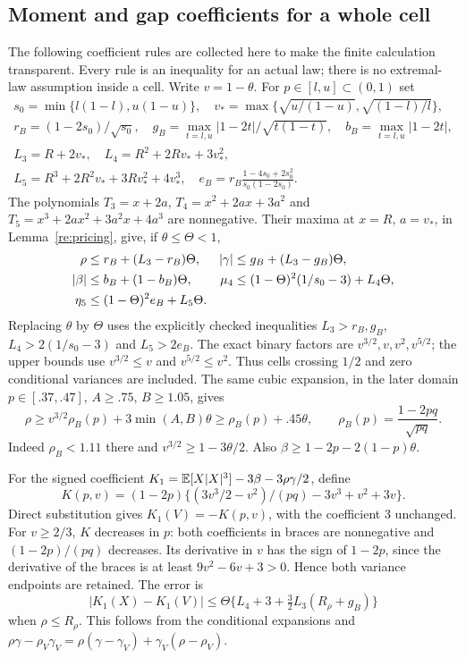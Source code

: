 \subsection{Moment and gap coefficients for a whole cell}
\label{mom:conditional-boxes}

The following coefficient rules are collected here to make the finite
calculation transparent. Every rule is an inequality for an actual law;
there is no extremal-law assumption inside a cell.
Write $v=1-\theta$. For $p\in[l,u]\subset(0,1)$ set
\begin{gather*}
 s_0=\min\{l(1-l),u(1-u)\},\quad
 v_* =\max\{\sqrt{u/(1-u)},\sqrt{(1-l)/l}\},\\
 r_B=(1-2s_0)/\sqrt{s_0},\quad
 g_B=\max_{t=l,u}|1-2t|/\sqrt{t(1-t)},\quad b_B=\max_{t=l,u}|1-2t|,\\
 L_3=R+2v_*,\quad L_4=R^2+2Rv_*+3v_*^2,\\
 L_5=R^3+2R^2v_*+3Rv_*^2+4v_*^3,\quad
 e_B=r_B\frac{1-4s_0+2s_0^2}{s_0(1-2s_0)}.
\end{gather*}
The polynomials $T_3=x+2a$, $T_4=x^2+2ax+3a^2$ and
$T_5=x^3+2ax^2+3a^2x+4a^3$ are nonnegative. Their maxima at
$x=R$, $a=v_*$, in Lemma~\ref{re:pricing}, give, if $\theta\le\Theta<1$,
\begin{align}
 \rho&\le r_B+(L_3-r_B)\Theta,&
 |\gamma|&\le g_B+(L_3-g_B)\Theta,\notag\\
 |\beta|&\le b_B+(1-b_B)\Theta,&
 \mu_4&\le(1-\Theta)^2(1/s_0-3)+L_4\Theta,\notag\\
 \eta_5&\le(1-\Theta)^2e_B+L_5\Theta.&&\label{mom:boxes}
\end{align}
Replacing $\theta$ by $\Theta$ uses the explicitly checked inequalities
$L_3>r_B,g_B$, $L_4>2(1/s_0-3)$ and $L_5>2e_B$.
The exact binary factors are $v^{3/2},v,v^2,v^{5/2}$; the upper bounds
use $v^{3/2}\le v$ and $v^{5/2}\le v^2$. Thus cells crossing $1/2$ and
zero conditional variances are included. The same cubic expansion, in the
later domain $p\in[.37,.47]$, $A\ge.75$, $B\ge1.05$, gives
\begin{equation}\label{mom:rho-lower}
 \rho\ge v^{3/2}\rho_B(p)+3\min(A,B)\theta
       \ge\rho_B(p)+.45\theta,\qquad
 \rho_B(p)=\frac{1-2pq}{\sqrt{pq}}.
\end{equation}
Indeed $\rho_B<1.11$ there and $v^{3/2}\ge1-3\theta/2$.
Also $\beta\ge1-2p-2(1-p)\theta$.

For the signed coefficient
$K_1=\mathbb E[X|X|^3]-3\beta-3\rho\gamma/2$, define
\[
 K(p,v)=(1-2p)\{(3v^3/2-v^2)/(pq)-3v^3+v^2+3v\}.
\]
Direct substitution gives $K_1(V)=-K(p,v)$, with the coefficient $3$
unchanged. For $v\ge2/3$, $K$ decreases in $p$: both coefficients in
braces are nonnegative and $(1-2p)/(pq)$ decreases. Its derivative in $v$
has the sign of $1-2p$, since the derivative of the braces is at least
$9v^2-6v+3>0$. Hence both variance endpoints are retained. The error is
\begin{equation}\label{mom:K-error}
 |K_1(X)-K_1(V)|\le
 \Theta\{L_4+3+\tfrac32L_3(R_\rho+g_B)\}
\end{equation}
when $\rho\le R_\rho$. This follows from the conditional expansions and
$\rho\gamma-\rho_V\gamma_V=
\rho(\gamma-\gamma_V)+\gamma_V(\rho-\rho_V)$.

